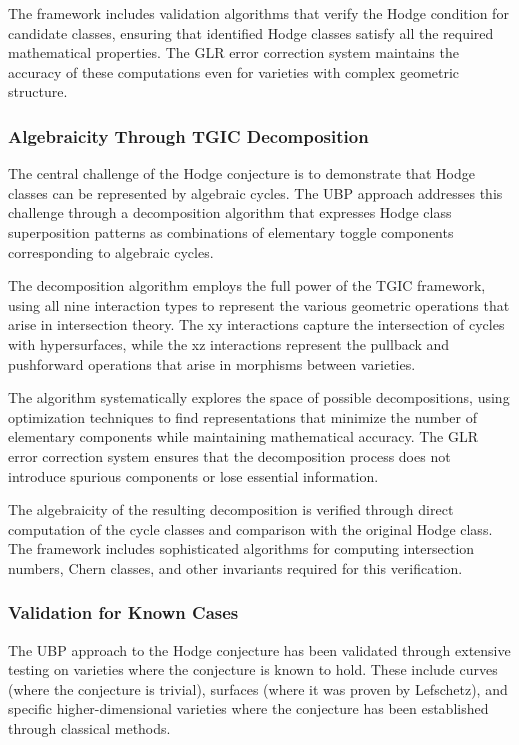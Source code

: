 \documentclass[11pt]{amsart}
\begin{document}
The framework includes validation algorithms that verify the Hodge condition for candidate classes, ensuring that identified Hodge classes satisfy all the required mathematical properties. The GLR error correction system maintains the accuracy of these computations even for varieties with complex geometric structure.

\subsubsection{Algebraicity Through TGIC Decomposition}

The central challenge of the Hodge conjecture is to demonstrate that Hodge classes can be represented by algebraic cycles. The UBP approach addresses this challenge through a decomposition algorithm that expresses Hodge class superposition patterns as combinations of elementary toggle components corresponding to algebraic cycles.

The decomposition algorithm employs the full power of the TGIC framework, using all nine interaction types to represent the various geometric operations that arise in intersection theory. The xy interactions capture the intersection of cycles with hypersurfaces, while the xz interactions represent the pullback and pushforward operations that arise in morphisms between varieties.

The algorithm systematically explores the space of possible decompositions, using optimization techniques to find representations that minimize the number of elementary components while maintaining mathematical accuracy. The GLR error correction system ensures that the decomposition process does not introduce spurious components or lose essential information.

The algebraicity of the resulting decomposition is verified through direct computation of the cycle classes and comparison with the original Hodge class. The framework includes sophisticated algorithms for computing intersection numbers, Chern classes, and other invariants required for this verification.

\subsubsection{Validation for Known Cases}

The UBP approach to the Hodge conjecture has been validated through extensive testing on varieties where the conjecture is known to hold. These include curves (where the conjecture is trivial), surfaces (where it was proven by Lefschetz), and specific higher-dimensional varieties where the conjecture has been established through classical methods.
\end{document}

